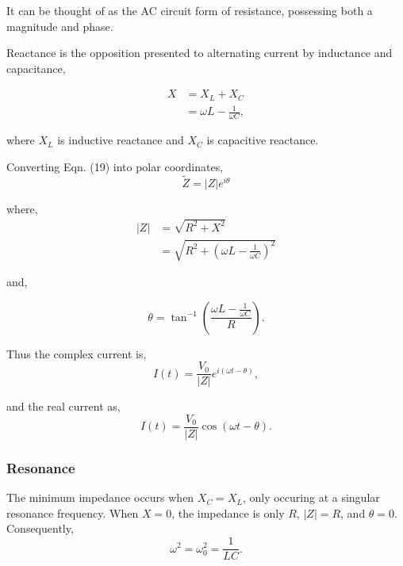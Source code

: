 \documentclass{article}
\begin{document}
It can be thought of as the AC circuit form of
resistance, possessing both a magnitude and phase.

Reactance is the opposition presented to alternating current
by inductance and capacitance,

\begin{equation}
    \begin{split}
        X &= X_L + X_C \\
        &= \omega L - \frac{1}{\omega C},
    \end{split}
\end{equation}

where $X_L$ is inductive reactance and $X_C$ is capacitive
reactance.

Converting Eqn. (19) into polar coordinates,
\begin{equation}
    \tilde{Z} = |Z|e^{i\theta}
\end{equation}

where,
\begin{equation}
    \begin{split}
    |Z| &= \sqrt{R^2+X^2} \\
    &=\sqrt{R^2+(\omega L - \frac{1}{\omega C})^2}   
    \end{split}
\end{equation}

and,

\begin{equation}
    \theta = \tan^{-1}{\left(\frac{\omega L - \frac{1}{\omega C}}{R}\right)}.
\end{equation}

Thus the complex current is,
\begin{equation}
    I(t) = \frac{V_0}{|Z|}e^{i\left(\omega t - \theta \right)},
\end{equation}

and the real current as,
\begin{equation}
    I(t) = \frac{V_0}{|Z|}\cos\left(\omega t - \theta\right).
\end{equation}

\subsubsection{Resonance}
The minimum impedance occurs when $X_C = X_L$, only occuring at
a singular resonance frequency. When $X = 0$, the impedance is 
only $R$, $|Z| = R$, and $\theta = 0$. Consequently,
\begin{equation}
    \omega^2 = \omega_0^2 = \frac{1}{LC}.
\end{equation}
\end{document}
